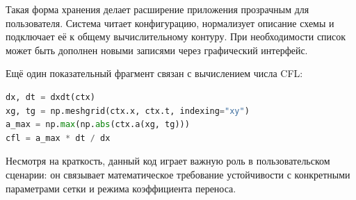 \documentclass[a4paper,14pt]{extreport}
\begin{document}
Такая форма хранения делает расширение приложения прозрачным для пользователя. Система читает конфигурацию, нормализует описание схемы и подключает её к общему вычислительному контуру. При необходимости список может быть дополнен новыми записями через графический интерфейс.

Ещё один показательный фрагмент связан с вычислением числа CFL:

\begin{lstlisting}[language=Python,caption={Расчёт числа Куранта в приложении}]
dx, dt = dxdt(ctx)
xg, tg = np.meshgrid(ctx.x, ctx.t, indexing="xy")
a_max = np.max(np.abs(ctx.a(xg, tg)))
cfl = a_max * dt / dx
\end{lstlisting}

Несмотря на краткость, данный код играет важную роль в пользовательском сценарии: он связывает математическое требование устойчивости с конкретными параметрами сетки и режима коэффициента переноса.
\end{document}
